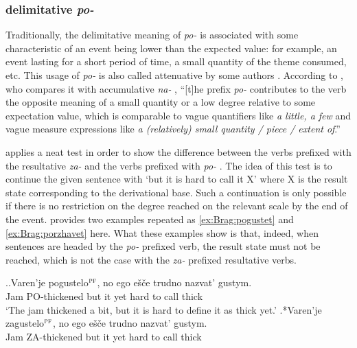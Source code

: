 \subsubsection{delimitative  \textit{po-}  }
Traditionally, the delimitative  meaning of \textit{po-}   is associated with some characteristic of an event being lower than the expected value: for example, an event lasting for a short period of time, a small quantity of the theme consumed, etc. This usage of \textit{po-}   is also called attenuative  by some authors \citep[e.g.][]{Svenonius:04b}. According to \citet[47--48]{Filip:00}, who compares it with accumulative  \textit{na-}  , ``[t]he prefix \textit{po-}   contributes to the verb the opposite meaning of a small quantity or a low degree relative to some expectation value, which is comparable to vague quantifiers like \textit{a little, a few} and vague measure expressions like \textit{a (relatively) small quantity / piece / extent of}.''

\citet[183]{Braginsky:08} applies a neat test in order to show the difference between the verbs prefixed with the resultative  \textit{za-}   and the verbs prefixed with \textit{po-}  . The idea of this test is to continue the given sentence with `but it is hard to call it X' where X is the result state corresponding to the derivational base. Such a continuation is only possible if there is no restriction on the degree reached on the relevant scale by the end of the event. \citet[183]{Braginsky:08} provides two examples repeated as \ref{ex:Brag:pogustet} and \ref{ex:Brag:porzhavet} here. What these examples show is that, indeed, when sentences are headed by the \textit{po-}  prefixed verb, the result state must not be reached, which is not the case with the \textit{za-}  prefixed resultative  verbs.

\ex.\label{ex:Brag:pogustet}\ag.Varen'je pogustelo$^{\textsc{pf}}$, no ego e\v{s}\v{c}e trudno nazvat' gustym.\\
Jam PO-thickened but it yet hard {to call} thick\\
\trans `The jam thickened a bit, but it is hard to define it as thick yet.'
\bg.*Varen'je zagustelo$^{\textsc{pf}}$, no ego e\v{s}\v{c}e trudno nazvat' gustym.\\
Jam ZA-thickened but it yet hard {to call} thick\\

